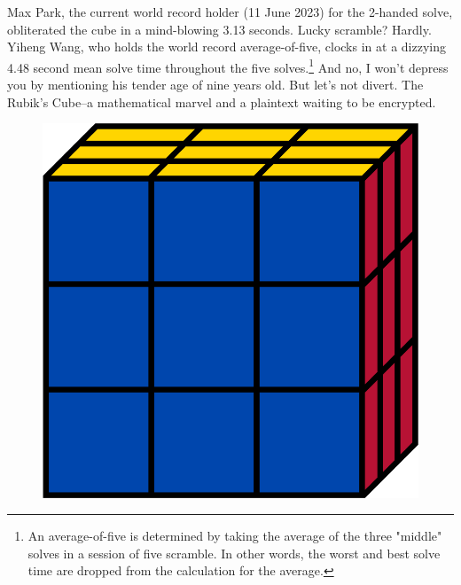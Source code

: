 \documentclass[12pt]{article}
\begin{document}
Max Park, the current world record holder (11 June 2023) for the 2-handed solve, obliterated the cube in a mind-blowing 3.13 seconds. Lucky scramble? Hardly. Yiheng Wang, who holds the world record average-of-five, clocks in at a dizzying 4.48 second mean solve time throughout the five solves.\footnote{An average-of-five is determined by taking the average of the three "middle" solves in a session of five scramble. In other words, the worst and best solve time are dropped from the calculation for the average.} And no, I won't depress you by mentioning his tender age of nine years old. But let's not divert. The Rubik's Cube--a mathematical marvel and a plaintext waiting to be encrypted. \\
\begin{figure}[h]
    \centering
    \begin{minipage}[c]{0.2\textwidth}
        \includegraphics[scale=0.1]{cube.png}
    \end{minipage}
    \begin{minipage}[c]{0.2\textwidth}

\end{minipage}
\end{figure}
\end{document}
